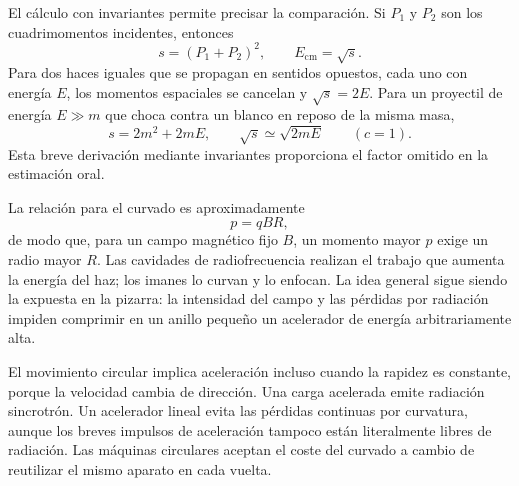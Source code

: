 El cálculo con invariantes permite precisar la comparación. Si \(P_1\) y \(P_2\) son los cuadrimomentos incidentes, entonces
\begin{equation}
s=(P_1+P_2)^2,
\qquad E_{\mathrm{cm}}=\sqrt{s}.
\end{equation}
Para dos haces iguales que se propagan en sentidos opuestos, cada uno con energía \(E\), los momentos espaciales se cancelan y \(\sqrt{s}=2E\). Para un proyectil de energía \(E\gg m\) que choca contra un blanco en reposo de la misma masa,
\begin{equation}
s=2m^2+2mE,
\qquad
\sqrt{s}\simeq \sqrt{2mE}
\qquad (c=1).
\end{equation}
Esta breve derivación mediante invariantes proporciona el factor omitido en la estimación oral.

\begin{classroomqa}\end{classroomqa}

La relación para el curvado es aproximadamente
\begin{equation}
p=qBR,
\end{equation}
de modo que, para un campo magnético fijo \(B\), un momento mayor \(p\) exige un radio mayor \(R\). Las cavidades de radiofrecuencia realizan el trabajo que aumenta la energía del haz; los imanes lo curvan y lo enfocan. La idea general sigue siendo la expuesta en la pizarra: la intensidad del campo y las pérdidas por radiación impiden comprimir en un anillo pequeño un acelerador de energía arbitrariamente alta.

El movimiento circular implica aceleración incluso cuando la rapidez es constante, porque la velocidad cambia de dirección. Una carga acelerada emite radiación sincrotrón. Un acelerador lineal evita las pérdidas continuas por curvatura, aunque los breves impulsos de aceleración tampoco están literalmente libres de radiación. Las máquinas circulares aceptan el coste del curvado a cambio de reutilizar el mismo aparato en cada vuelta.

